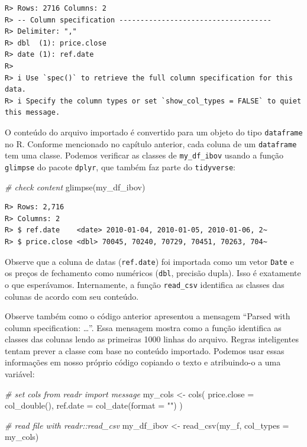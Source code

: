 \documentclass[
  11pt,
]{book}
\newenvironment{Shaded}{\begin{snugshade}}{\end{snugshade}}
\newcommand{\AttributeTok}[1]{\textcolor[rgb]{0.61,0.61,0.61}{#1}}
\newcommand{\CommentTok}[1]{\textcolor[rgb]{0.37,0.37,0.37}{\textit{#1}}}
\newcommand{\FunctionTok}[1]{\textcolor[rgb]{0,0,0}{#1}}
\newcommand{\NormalTok}[1]{#1}
\newcommand{\OtherTok}[1]{\textcolor[rgb]{0.37,0.37,0.37}{#1}}
\newcommand{\StringTok}[1]{\textcolor[rgb]{0.5,0.5,0.5}{#1}}
\begin{document}
\begin{verbatim}
R> Rows: 2716 Columns: 2
R> -- Column specification ------------------------------------
R> Delimiter: ","
R> dbl  (1): price.close
R> date (1): ref.date
R> 
R> i Use `spec()` to retrieve the full column specification for this data.
R> i Specify the column types or set `show_col_types = FALSE` to quiet this message.
\end{verbatim}

O conteúdo do arquivo importado é convertido para um objeto do tipo \texttt{dataframe} no R. Conforme mencionado no capítulo anterior, cada coluna de um \texttt{dataframe} tem uma classe. Podemos verificar as classes de \texttt{my\_df\_ibov} usando a função \texttt{glimpse} do pacote \texttt{dplyr}, que também faz parte do \texttt{tidyverse}:

\begin{Shaded}
\begin{Highlighting}[]
\CommentTok{\# check content}
\FunctionTok{glimpse}\NormalTok{(my\_df\_ibov)}
\end{Highlighting}
\end{Shaded}

\begin{verbatim}
R> Rows: 2,716
R> Columns: 2
R> $ ref.date    <date> 2010-01-04, 2010-01-05, 2010-01-06, 2~
R> $ price.close <dbl> 70045, 70240, 70729, 70451, 70263, 704~
\end{verbatim}

Observe que a coluna de datas (\texttt{ref.date}) foi importada como um vetor \texttt{Date} e os preços de fechamento como numéricos (\texttt{dbl}, precisão dupla). Isso é exatamente o que esperávamos. Internamente, a função \texttt{read\_csv} identifica as classes das colunas de acordo com seu conteúdo.

Observe também como o código anterior apresentou a mensagem ``Parsed with column specification: \ldots{}''. Essa mensagem mostra como a função identifica as classes das colunas lendo as primeiras 1000 linhas do arquivo. Regras inteligentes tentam prever a classe com base no conteúdo importado. Podemos usar essas informações em nosso próprio código copiando o texto e atribuindo-o a uma variável: 

\begin{Shaded}
\begin{Highlighting}[]
\CommentTok{\# set cols from readr import message}
\NormalTok{my\_cols }\OtherTok{\textless{}{-}} \FunctionTok{cols}\NormalTok{(}
  \AttributeTok{price.close =} \FunctionTok{col\_double}\NormalTok{(),}
  \AttributeTok{ref.date =} \FunctionTok{col\_date}\NormalTok{(}\AttributeTok{format =} \StringTok{""}\NormalTok{)}
\NormalTok{)}

\CommentTok{\# read file with readr::read\_csv}
\NormalTok{my\_df\_ibov }\OtherTok{\textless{}{-}} \FunctionTok{read\_csv}\NormalTok{(my\_f,}
                       \AttributeTok{col\_types =}\NormalTok{ my\_cols)}
\end{Highlighting}
\end{Shaded}
\end{document}
